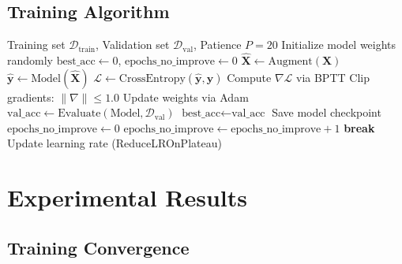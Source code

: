 \documentclass[12pt, a4paper]{article}
\begin{document}
\subsection{Training Algorithm}

\begin{algorithm}[H]
    \caption{Training Procedure with Early Stopping}
    \label{alg:training}
    \begin{algorithmic}[1]
        \Require Training set $\mathcal{D}_{\text{train}}$, Validation set $\mathcal{D}_{\text{val}}$, Patience $P=20$
        \State Initialize model weights randomly
        \State $\text{best\_acc} \gets 0$, $\text{epochs\_no\_improve} \gets 0$
                \State $\hat{\mathbf{X}} \gets \text{Augment}(\mathbf{X})$ 
                \State $\hat{\mathbf{y}} \gets \text{Model}(\hat{\mathbf{X}})$ 
                \State $\mathcal{L} \gets \text{CrossEntropy}(\hat{\mathbf{y}}, \mathbf{y})$
                \State Compute $\nabla \mathcal{L}$ via BPTT
                \State Clip gradients: $\|\nabla\| \leq 1.0$
                \State Update weights via Adam
            \EndFor
            \State $\text{val\_acc} \gets \text{Evaluate}(\text{Model}, \mathcal{D}_{\text{val}})$
                \State $\text{best\_acc} \gets \text{val\_acc}$
                \State Save model checkpoint
                \State $\text{epochs\_no\_improve} \gets 0$
            \Else
                \State $\text{epochs\_no\_improve} \gets \text{epochs\_no\_improve} + 1$
            \EndIf
                \State \textbf{break} 
            \EndIf
            \State Update learning rate (ReduceLROnPlateau)
        \EndFor
    \end{algorithmic}
\end{algorithm}

\section{Experimental Results}
\label{sec:results}

\subsection{Training Convergence}
\end{document}
